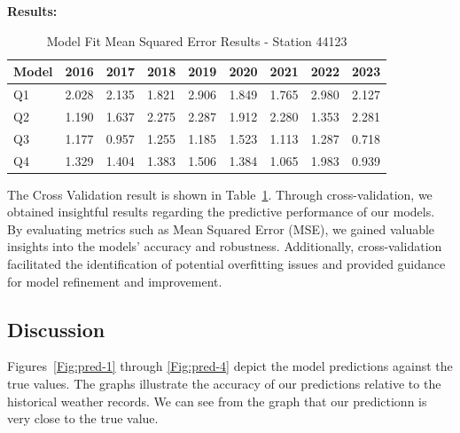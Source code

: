 \documentclass[12pt]{article}
\begin{document}
\textbf{Results:}

\begin{table}[h]
\centering
\caption{Model Fit Mean Squared Error Results - Station 44123}
\label{tab:CV-result}
\begin{tabular}{@{}lllllllll@{}}
\toprule
\textbf{Model} & \textbf{2016} & \textbf{2017} & \textbf{2018} & \textbf{2019} & \textbf{2020} & \textbf{2021} & \textbf{2022} & \textbf{2023} \\ 
\midrule
Q1        & 2.028            & 2.135            & 1.821            & 2.906            & 1.849            & 1.765            & 2.980            & 2.127            \\
Q2        & 1.190            & 1.637            & 2.275            & 2.287            & 1.912            & 2.280            & 1.353            & 2.281            \\
Q3        & 1.177            & 0.957            & 1.255            & 1.185            & 1.523            & 1.113            & 1.287            & 0.718            \\
Q4        & 1.329            & 1.404            & 1.383            & 1.506            & 1.384            & 1.065            & 1.983            & 0.939            \\ 
\bottomrule
\end{tabular}
\end{table}

The Cross Validation result is shown in Table~\ref{tab:CV-result}. Through cross-validation, we obtained insightful results regarding the predictive performance of our models. By evaluating metrics such as Mean Squared Error (MSE), we gained valuable insights into the models' accuracy and robustness. Additionally, cross-validation facilitated the identification of potential overfitting issues and provided guidance for model refinement and improvement.



\subsection{Discussion}

Figures~\ref{Fig:pred-1} through \ref{Fig:pred-4} depict the model predictions against the true values. The graphs illustrate the accuracy of our predictions relative to the historical weather records. We can see from the graph that our predictionn is very close to the true value.
\end{document}
